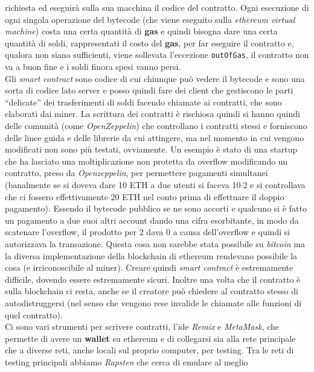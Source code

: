 \documentclass[a4paper,12pt, oneside]{book}
\begin{document}
richiesta ed eseguirà sulla sua macchina il codice del contratto. Ogni
esecuzione di ogni singola operazione del bytecode (che viene eseguito sulla
\textit{ethereum virtual machine}) costa una certa quantità di \textbf{gas} e
quindi bisogna dare una certa quantità di soldi, rappresentati il costo del
\textbf{gas}, per far eseguire il contratto e, 
qualora non siano sufficienti, viene sollevata l'eccezione \texttt{outOfGas}, il
contratto non va a buon fine e i soldi finora spesi vanno persi.\\
Gli \textit{smart contract} sono codice di cui chiunque può vedere il bytecode e
sono una sorta di codice lato server e posso quindi fare dei client che
gestiscono le parti ``delicate'' dei trasferimenti di soldi facendo chiamate ai
contratti, che sono elaborati dai miner. La scrittura dei contratti è rischiosa
quindi si hanno quindi delle comunità (come \textit{OpenZeppelin}) che
controllano i contratti stessi e forniscono delle linee guida e delle librerie
da cui attingere, ma nel momento in cui vengono modificati non sono più testati,
ovviamente. Un esempio è stato di una startup che ha lasciato una
moltiplicazione non protetta da overflow modificando un contratto, preso da
\textit{Openzeppelin}, per permettere pagamenti simultanei (banalmente se si
doveva dare 10 ETH a due utenti si faceva 10$\cdot$2 e si controllava che ci
fossero effettivamente 20 ETH nel conto prima di effettuare il doppio
pagamento). Essendo il bytecode 
pubblico se ne sono accorti e qualcuno si è fatto un pagamento a due suoi altri
account dando una cifra esorbitante, in modo da scatenare l'overflow, il
prodotto per 2 dava 0 a causa dell'overflow e quindi si autorizzava la
transazione. Questa cosa non sarebbe stata possibile su \textit{bitcoin} ma la
diversa implementazione della blockchain di ethereum rendevano possibile la cosa
(e irriconoscibile al miner). Creare quindi \textit{smart contract} è
estremamente difficile, dovendo essere estremamente sicuri. Inoltre una volta
che il contratto è sulla blockchain ci resta, anche se il creatore può chiedere
al contratto stesso di autodistruggersi (nel senso che vengono rese invalide le
chiamate alle funzioni di quel contratto).\\
Ci sono vari strumenti per scrivere contratti, l'ide \textit{Remix} e
\textit{MetaMask}, che permette di avere un \textbf{wallet} su ethereum e di
collegarsi sia alla rete principale che a 
diverse reti, anche locali sul proprio computer, per testing. Tra le reti di
testing principali abbiamo \textit{Rapsten} che cerca di emulare al meglio
\end{document}
